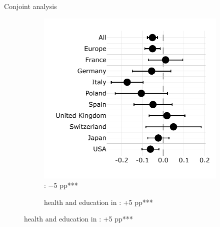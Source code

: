 \documentclass[aspectratio=169,xcolor=dvipsnames, 11pt,mathserif]{beamer}
\begin{document}
\begin{frame}{Conjoint analysis} 
    \begin{figure}
\caption{ the  political  of containing the following policy%
} \vspace{-.3cm}
\begin{subfigure}{.48\textwidth}
  \caption[]{: $-$5 pp*** \quad {}}\vspace{-.3cm}
  \includegraphics[width=\textwidth]{../figures/country_comparison/program_preferred_by_cut_aid_in_program.pdf}
\end{subfigure} \pause
\begin{subfigure}{.50\textwidth}
  \caption[]{ health and education in : +5 pp*** \quad {}} \vspace{-.3cm}

\end{subfigure}
\end{figure}
\end{frame}
\end{document}
